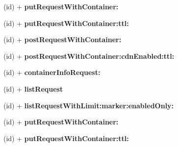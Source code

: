 \begin{DoxyCompactItemize}
\item 
\hypertarget{interface_a_s_i_cloud_files_c_d_n_request_a92d1b9ce687974a8ffab0b026a39eb28}{
(id) + {\bfseries put\-Request\-With\-Container\-:}}
\label{interface_a_s_i_cloud_files_c_d_n_request_a92d1b9ce687974a8ffab0b026a39eb28}

\item 
\hypertarget{interface_a_s_i_cloud_files_c_d_n_request_ab7db6c10a48bfb16bdae65e5d7740148}{
(id) + {\bfseries put\-Request\-With\-Container\-:ttl\-:}}
\label{interface_a_s_i_cloud_files_c_d_n_request_ab7db6c10a48bfb16bdae65e5d7740148}

\item 
\hypertarget{interface_a_s_i_cloud_files_c_d_n_request_aa201c29194b1b8465c6b45a582904573}{
(id) + {\bfseries post\-Request\-With\-Container\-:}}
\label{interface_a_s_i_cloud_files_c_d_n_request_aa201c29194b1b8465c6b45a582904573}

\item 
\hypertarget{interface_a_s_i_cloud_files_c_d_n_request_adc0b232663fe13af064f00522d6da305}{
(id) + {\bfseries post\-Request\-With\-Container\-:cdn\-Enabled\-:ttl\-:}}
\label{interface_a_s_i_cloud_files_c_d_n_request_adc0b232663fe13af064f00522d6da305}

\item 
\hypertarget{interface_a_s_i_cloud_files_c_d_n_request_a7530647efafef518b550f6390b6b4c30}{
(id) + {\bfseries container\-Info\-Request\-:}}
\label{interface_a_s_i_cloud_files_c_d_n_request_a7530647efafef518b550f6390b6b4c30}

\item 
\hypertarget{interface_a_s_i_cloud_files_c_d_n_request_a9d7f472b708be8a5bbff26ecf72ca0e7}{
(id) + {\bfseries list\-Request}}
\label{interface_a_s_i_cloud_files_c_d_n_request_a9d7f472b708be8a5bbff26ecf72ca0e7}

\item 
\hypertarget{interface_a_s_i_cloud_files_c_d_n_request_a3acbf036c7e416c2b6f66ac6be6a9617}{
(id) + {\bfseries list\-Request\-With\-Limit\-:marker\-:enabled\-Only\-:}}
\label{interface_a_s_i_cloud_files_c_d_n_request_a3acbf036c7e416c2b6f66ac6be6a9617}

\item 
\hypertarget{interface_a_s_i_cloud_files_c_d_n_request_a92d1b9ce687974a8ffab0b026a39eb28}{
(id) + {\bfseries put\-Request\-With\-Container\-:}}
\label{interface_a_s_i_cloud_files_c_d_n_request_a92d1b9ce687974a8ffab0b026a39eb28}

\item 
\hypertarget{interface_a_s_i_cloud_files_c_d_n_request_ab7db6c10a48bfb16bdae65e5d7740148}{
(id) + {\bfseries put\-Request\-With\-Container\-:ttl\-:}}
\label{interface_a_s_i_cloud_files_c_d_n_request_ab7db6c10a48bfb16bdae65e5d7740148}


\end{DoxyCompactItemize}
